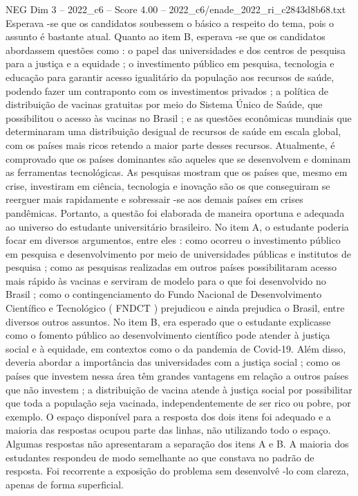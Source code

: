 \begin{textsample}{NEG Dim 3 – 2022\_c6 – Score 4.00 – 2022\_c6/enade\_2022\_ri\_c2843d8b68.txt}
Esperava -se que os candidatos soubessem o básico a respeito do tema, pois o assunto é bastante atual.
Quanto ao item B, esperava -se que os candidatos abordassem questões como : o papel das universidades e dos centros de pesquisa para a justiça e a equidade ; o investimento público em pesquisa, tecnologia e educação para garantir acesso igualitário da população aos recursos de saúde, podendo fazer um contraponto com os investimentos privados ; a política de distribuição de vacinas gratuitas por meio do Sistema Único de Saúde, que possibilitou o acesso às vacinas no Brasil ; e as questões econômicas mundiais que determinaram uma distribuição desigual de recursos de saúde em escala global, com os países mais ricos retendo a maior parte desses recursos.
Atualmente, é comprovado que os países dominantes são aqueles que se desenvolvem e dominam as ferramentas tecnológicas.
As pesquisas mostram que os países que, mesmo em crise, investiram em ciência, tecnologia e inovação são os que conseguiram se reerguer mais rapidamente e sobressair -se aos demais países em crises pandêmicas.
Portanto, a questão foi elaborada de maneira oportuna e adequada ao universo do estudante universitário brasileiro.
No item A, o estudante poderia focar em diversos argumentos, entre eles : como ocorreu o investimento público em pesquisa e desenvolvimento por meio de universidades públicas e institutos de pesquisa ; como as pesquisas realizadas em outros países possibilitaram acesso mais rápido às vacinas e serviram de modelo para o que foi desenvolvido no Brasil ; como o contingenciamento do Fundo Nacional de Desenvolvimento Científico e Tecnológico ( FNDCT ) prejudicou e ainda prejudica o Brasil, entre diversos outros assuntos.
No item B, era esperado que o estudante explicasse como o fomento público ao desenvolvimento científico pode atender à justiça social e à equidade, em contextos como o da pandemia de Covid-19.
Além disso, deveria abordar a importância das universidades com a justiça social ; como os países que investem nessa área têm grandes vantagens em relação a outros países que não investem ; a distribuição de vacina atende à justiça social por possibilitar que toda a população seja vacinada, independentemente de ser rico ou pobre, por exemplo.
O espaço disponível para a resposta dos dois itens foi adequado e a maioria das respostas ocupou parte das linhas, não utilizando todo o espaço.
Algumas respostas não apresentaram a separação dos itens A e B.
A maioria dos estudantes respondeu de modo semelhante ao que constava no padrão de resposta.
Foi recorrente a exposição do problema sem desenvolvê -lo com clareza, apenas de forma superficial.

\end{textsample}
